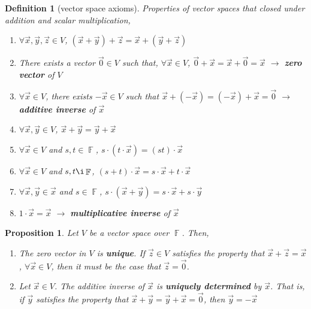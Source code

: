 \documentclass[10pt]{article}
\DeclareMathOperator{\F}{{\mathbb{F}}}
\theoremstyle{break}
\newtheorem{defn}{Definition}[subsection]
\newtheorem{prop}[thm]{Proposition}
\begin{document}
\begin{defn}[vector space axioms] Properties of vector spaces that closed under addition and scalar multiplication, 
    \begin{enumerate}
        \item $\forall \vec{x}, \vec{y}, \vec{z} \in V$, $(\vec{x} + \vec{y}) + \vec{z} = \vec{x} + (\vec{y} + \vec{z})$
        \item There exists a vector $\vec{0} \in V$ such that, $\forall \vec{x} \in V$, $\vec{0} + \vec{x} = \vec{x} + \vec{0} = \vec{x}$ \hspace{0.5ex} $\to$ \hspace{0.5ex} \textbf{zero vector} of $V$
        \item $\forall \vec{x} \in V$, there exists $-\vec{x} \in V$ such that $\vec{x} + (-\vec{x}) = (-\vec{x}) + \vec{x} = \vec{0}$ \hspace{0.5ex} $\to$ \hspace{0.5ex} \textbf{additive inverse} of $\vec{x}$
        \item $\forall \vec{x}, \vec{y} \in V$, $\vec{x} + \vec{y} = \vec{y} + \vec{x}$
        \item $\forall \vec{x} \in V$ and $s, t \in \F$, $s \cdot (t \cdot \vec{x}) = (st) \cdot \vec{x}$
        \item $\forall \vec{x} \in V$ and $s, t \i  \F$, $(s + t) \cdot \vec{x} = s \cdot \vec{x} + t \cdot \vec{x}$
        \item $\forall \vec{x}, \vec{y} \in \vec{x}$ and $s \in \F$, $s \cdot (\vec{x} + \vec{y}) = s \cdot \vec{x} + s \cdot \vec{y}$
        \item $1 \cdot \vec{x} = \vec{x}$ \hspace{0.5ex} $\to$ \hspace{0.5ex} \textbf{multiplicative inverse} of $\vec{x}$
    \end{enumerate}
\end{defn}
\begin{prop}
    Let $V$ be a vector space over $\F$. Then, 
    \begin{enumerate}
        \item[a.] The zero vector in $V$ is \textbf{unique}. If $\vec{z} \in V$ satisfies the property that $\vec{x} + \vec{z} = \vec{x}$, $\forall \vec{x} \in V$, then it must be the case that $\vec{z} = \vec{0}$.
        \item[b.] Let $\vec{x} \in V$. The additive inverse of $\vec{x}$ is \textbf{uniquely determined} by $\vec{x}$. That is, if $\vec{y}$ satisfies the property that $\vec{x} + \vec{y} = \vec{y} + \vec{x} = \vec{0}$, then $\vec{y} = -\vec{x}$
    \end{enumerate}
\end{prop}
\end{document}
